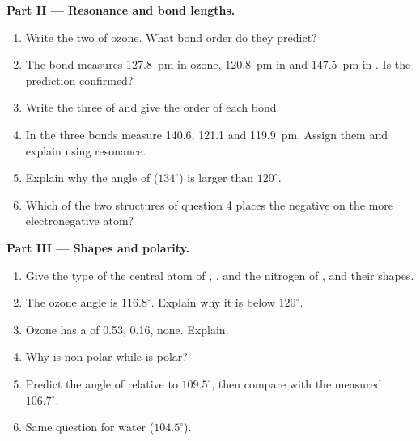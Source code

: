 \begin{problem}
\medskip
\noindent\textbf{Part II --- Resonance and bond lengths.}
\begin{enumerate}[resume]
  \item Write the two  of ozone. What bond order do
        they predict?
  \item The  bond measures \qty{127.8}{pm} in ozone,
        \qty{120.8}{pm} in  and \qty{147.5}{pm} in . Is
        the prediction confirmed?
  \item Write the three  of  and give the
        order of each  bond.
  \item In  the three  bonds measure 140.6, 121.1 and
        \qty{119.9}{pm}. Assign them and explain using resonance.
  \item Explain why the angle  of  ($134^\circ$) is
        larger than $120^\circ$.
  \item Which of the two structures of question 4 places the negative
         on the more electronegative atom?
\end{enumerate}

\medskip
\noindent\textbf{Part III --- Shapes and polarity.}
\begin{enumerate}[resume]
  \item Give the type  of the central atom of ,
        ,  and the nitrogen of , and their shapes.
  \item The ozone angle is $116.8^\circ$. Explain why it is below
        $120^\circ$.
  \item Ozone has a  of \qty{0.53}{\debye}, 
        \qty{0.16}{\debye},  none. Explain.
  \item Why is  non-polar while  is polar?
  \item Predict the angle of  relative to $109.5^\circ$, then
        compare with the measured $106.7^\circ$.
  \item Same question for water ($104.5^\circ$).
\end{enumerate}


\end{problem}
